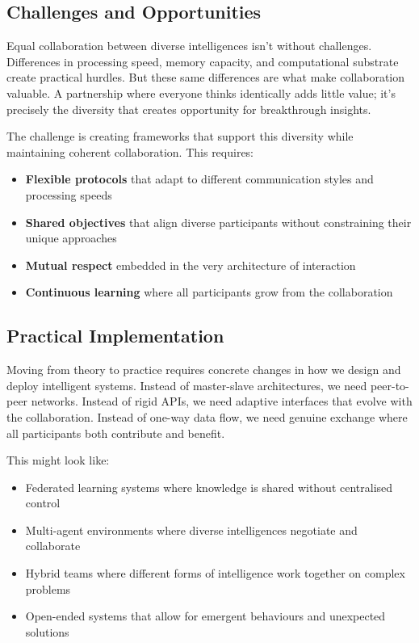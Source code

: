 \subsection{Challenges and Opportunities}

Equal collaboration between diverse intelligences isn't without challenges.
Differences in processing speed, memory capacity, and computational substrate create practical hurdles.
But these same differences are what make collaboration valuable.
A partnership where everyone thinks identically adds little value; it's precisely the diversity that creates opportunity for breakthrough insights.

The challenge is creating frameworks that support this diversity while maintaining coherent collaboration.
This requires:
\begin{itemize}
\item \textbf{Flexible protocols} that adapt to different communication styles and processing speeds
\item \textbf{Shared objectives} that align diverse participants without constraining their unique approaches
\item \textbf{Mutual respect} embedded in the very architecture of interaction
\item \textbf{Continuous learning} where all participants grow from the collaboration
\end{itemize}

\subsection{Practical Implementation}

Moving from theory to practice requires concrete changes in how we design and deploy intelligent systems.
Instead of master-slave architectures, we need peer-to-peer networks.
Instead of rigid APIs, we need adaptive interfaces that evolve with the collaboration.
Instead of one-way data flow, we need genuine exchange where all participants both contribute and benefit.

This might look like:
\begin{itemize}
\item Federated learning systems where knowledge is shared without centralised control
\item Multi-agent environments where diverse intelligences negotiate and collaborate
\item Hybrid teams where different forms of intelligence work together on complex problems
\item Open-ended systems that allow for emergent behaviours and unexpected solutions
\end{itemize}

